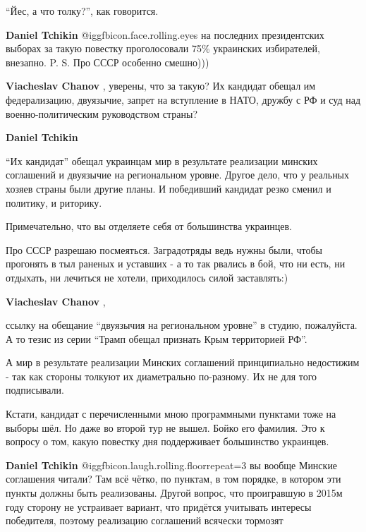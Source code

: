 \begin{itemize}
\begin{itemize}
\enquote{Йес, а что толку?}, как говорится.


\textbf{Daniel Tchikin}  @igg{fbicon.face.rolling.eyes} на последних президентских выборах за такую повестку проголосовали 75\% украинских избирателей, внезапно.
P. S. Про СССР особенно смешно)))

\textbf{Viacheslav Chanov} , уверены, что за такую? Их кандидат обещал им федерализацию, двуязычие, запрет на вступление в НАТО, дружбу с РФ и суд над военно-политическим руководством страны?

\textbf{Daniel Tchikin} 

\enquote{Их кандидат} обещал украинцам мир в результате реализации минских соглашений и
двуязычие на региональном уровне. Другое дело, что у реальных хозяев страны
были другие планы. И победивший кандидат резко сменил и политику, и риторику.

Примечательно, что вы отделяете себя от большинства украинцев.



Про СССР разрешаю посмеяться. Заградотряды ведь нужны были, чтобы прогонять в
тыл раненых и уставших - а то так рвались в бой, что ни есть, ни отдыхать, ни
лечиться не хотели, приходилось силой заставлять:)

\textbf{Viacheslav Chanov} , 

ссылку на обещание \enquote{двуязычия на региональном уровне} в студию, пожалуйста. А
то тезис из серии \enquote{Трамп обещал признать Крым территорией РФ}.

А мир в результате реализации Минских соглашений принципиально недостижим - так
как стороны толкуют их диаметрально по-разному. Их не для того подписывали.



Кстати, кандидат с перечисленными мною программными пунктами тоже на выборы
шёл. Но даже во второй тур не вышел. Бойко его фамилия. Это к вопросу о том,
какую повестку дня поддерживает большинство украинцев.

\textbf{Daniel Tchikin}  @igg{fbicon.laugh.rolling.floor}{repeat=3} вы вообще Минские соглашения читали?
Там всё чётко, по пунктам, в том порядке, в котором эти пункты должны быть реализованы.
Другой вопрос, что проигравшую в 2015м году сторону не устраивает вариант, что придётся учитывать интересы победителя, поэтому реализацию соглашений всячески тормозят


\end{itemize}
\end{itemize}
